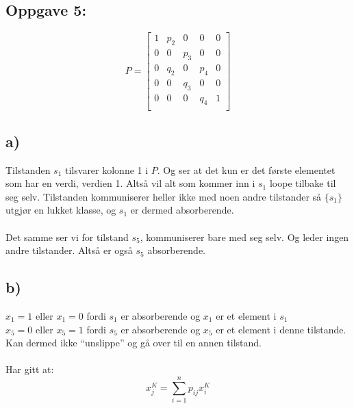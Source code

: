 \documentclass[a4paper, norsk, twoside, 10pt]{article}
\begin{document}
\begin{flushleft}
  \section*{Oppgave 5:}

  \def\matrixPgen{
    \begin{bmatrix}
      1 & p_{2} & 0 & 0 & 0 \\
      0 & 0   & p_{3} & 0 & 0 \\
      0 & q_{2} & 0 & p_{4} & 0 \\
      0 & 0   & q_{3} & 0 & 0 \\
      0 & 0 & 0 & q_{4} & 1 \\
   \end{bmatrix}
  }
   \[P = \matrixPgen \]
   \subsection*{a)}
   Tilstanden $s_{1}$ tilsvarer kolonne 1 i $P$. Og ser at det kun er det første elementet som har en verdi, verdien 1. Altså vil alt som kommer inn i $s_{1}$ loope tilbake til seg selv. Tilstanden kommuniserer heller ikke med noen andre tilstander så $\{s_{1}\}$ utgjør en lukket klasse, og $s_{1}$ er dermed absorberende.\\
   \ \\
   Det samme ser vi for tilstand $s_{5}$, kommuniserer bare med seg selv. Og leder ingen andre tilstander. Altså er også $s_{5}$ absorberende.


   \subsection*{b)}
   $x_{1} = 1$ eller $x_{1} = 0$ fordi $s_{1}$ er absorberende og $x_{1}$ er et element i $s_{1}$ \\
   $x_{5} = 0$ eller $x_{5} = 1$ fordi $s_{5}$ er absorberende og $x_{5}$ er et element i denne tilstande. Kan dermed ikke ``unslippe'' og gå over til en annen tilstand. \\
   \ \\
   Har gitt at:
   \[x_{j}^{K} = \sum_{i = 1}^{n} p_{ij}x_{i}^{K}\]\\


\end{flushleft}
\end{document}
